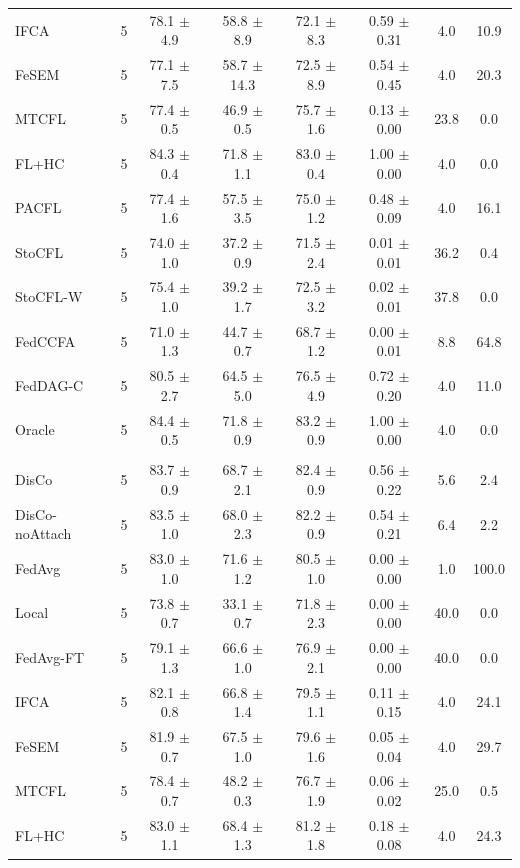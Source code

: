 {{\begin{tabular}{l r c c c c c c}
IFCA & 5 & 78.1 $\pm$ 4.9 & 58.8 $\pm$ 8.9 & 72.1 $\pm$ 8.3 & 0.59 $\pm$ 0.31 & 4.0 & 10.9 \\
FeSEM & 5 & 77.1 $\pm$ 7.5 & 58.7 $\pm$ 14.3 & 72.5 $\pm$ 8.9 & 0.54 $\pm$ 0.45 & 4.0 & 20.3 \\
MTCFL & 5 & 77.4 $\pm$ 0.5 & 46.9 $\pm$ 0.5 & 75.7 $\pm$ 1.6 & 0.13 $\pm$ 0.00 & 23.8 & 0.0 \\
FL+HC & 5 & 84.3 $\pm$ 0.4 & 71.8 $\pm$ 1.1 & 83.0 $\pm$ 0.4 & 1.00 $\pm$ 0.00 & 4.0 & 0.0 \\
PACFL & 5 & 77.4 $\pm$ 1.6 & 57.5 $\pm$ 3.5 & 75.0 $\pm$ 1.2 & 0.48 $\pm$ 0.09 & 4.0 & 16.1 \\
StoCFL & 5 & 74.0 $\pm$ 1.0 & 37.2 $\pm$ 0.9 & 71.5 $\pm$ 2.4 & 0.01 $\pm$ 0.01 & 36.2 & 0.4 \\
StoCFL-W & 5 & 75.4 $\pm$ 1.0 & 39.2 $\pm$ 1.7 & 72.5 $\pm$ 3.2 & 0.02 $\pm$ 0.01 & 37.8 & 0.0 \\
FedCCFA & 5 & 71.0 $\pm$ 1.3 & 44.7 $\pm$ 0.7 & 68.7 $\pm$ 1.2 & 0.00 $\pm$ 0.01 & 8.8 & 64.8 \\
FedDAG-C & 5 & 80.5 $\pm$ 2.7 & 64.5 $\pm$ 5.0 & 76.5 $\pm$ 4.9 & 0.72 $\pm$ 0.20 & 4.0 & 11.0 \\
Oracle & 5 & 84.4 $\pm$ 0.5 & 71.8 $\pm$ 0.9 & 83.2 $\pm$ 0.9 & 1.00 $\pm$ 0.00 & 4.0 & 0.0 \\
\addlinespace
\multicolumn{8}{l}{\textit{EMNIST label swap}} \\
DisCo & 5 & 83.7 $\pm$ 0.9 & 68.7 $\pm$ 2.1 & 82.4 $\pm$ 0.9 & 0.56 $\pm$ 0.22 & 5.6 & 2.4 \\
DisCo-noAttach & 5 & 83.5 $\pm$ 1.0 & 68.0 $\pm$ 2.3 & 82.2 $\pm$ 0.9 & 0.54 $\pm$ 0.21 & 6.4 & 2.2 \\
FedAvg & 5 & 83.0 $\pm$ 1.0 & 71.6 $\pm$ 1.2 & 80.5 $\pm$ 1.0 & 0.00 $\pm$ 0.00 & 1.0 & 100.0 \\
Local & 5 & 73.8 $\pm$ 0.7 & 33.1 $\pm$ 0.7 & 71.8 $\pm$ 2.3 & 0.00 $\pm$ 0.00 & 40.0 & 0.0 \\
FedAvg-FT & 5 & 79.1 $\pm$ 1.3 & 66.6 $\pm$ 1.0 & 76.9 $\pm$ 2.1 & 0.00 $\pm$ 0.00 & 40.0 & 0.0 \\
IFCA & 5 & 82.1 $\pm$ 0.8 & 66.8 $\pm$ 1.4 & 79.5 $\pm$ 1.1 & 0.11 $\pm$ 0.15 & 4.0 & 24.1 \\
FeSEM & 5 & 81.9 $\pm$ 0.7 & 67.5 $\pm$ 1.0 & 79.6 $\pm$ 1.6 & 0.05 $\pm$ 0.04 & 4.0 & 29.7 \\
MTCFL & 5 & 78.4 $\pm$ 0.7 & 48.2 $\pm$ 0.3 & 76.7 $\pm$ 1.9 & 0.06 $\pm$ 0.02 & 25.0 & 0.5 \\
FL+HC & 5 & 83.0 $\pm$ 1.1 & 68.4 $\pm$ 1.3 & 81.2 $\pm$ 1.8 & 0.18 $\pm$ 0.08 & 4.0 & 24.3 \\

\end{tabular}}}
